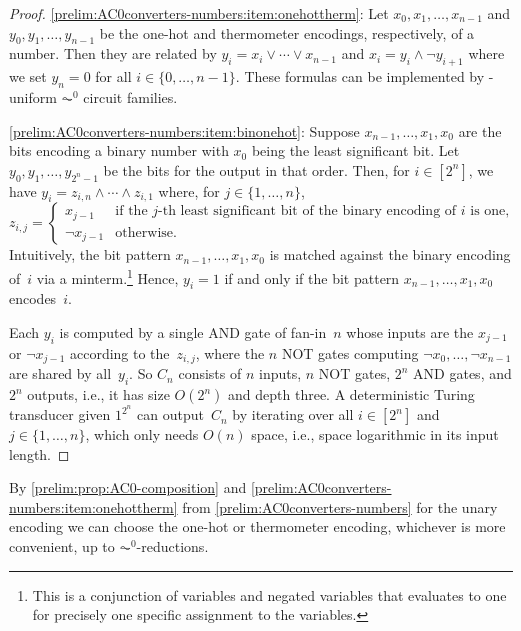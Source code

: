 \begin{proof}
\ref{prelim:AC0converters-numbers:item:onehottherm}: 
Let $x_0, x_1, \ldots, x_{n-1}$
and $y_0, y_1, \ldots, y_{n-1}$
be the one-hot and thermometer encodings, respectively, of a number.
Then they are related by 
$y_i  = x_i \lor \cdots \lor x_{n-1}$
and $x_i = y_i \land \neg y_{i+1}$ where we set $y_n = 0$
for all $i \in \{0,\ldots,n-1\}$.
These formulas can be implemented by \LOGSPACE-uniform $\AC^0$ circuit families.

\ref{prelim:AC0converters-numbers:item:binonehot}:
Suppose $x_{n-1}, \ldots, x_1, x_0$
are the bits encoding a binary number with $x_0$ being the least significant bit.
Let $y_0, y_1, \ldots, y_{2^n - 1}$
be the bits for the output in that order.
Then, for $i \in [2^n]$,
we have $y_i = z_{i,n} \land \cdots \land z_{i,1}$ where, for $j \in \{1,\ldots,n\}$,
\[
z_{i,j} = \begin{cases}
	x_{j-1}        & \text{if the $j$-th least significant bit of the binary encoding of $i$ is one,} \\
	\neg x_{j-1}   & \text{otherwise.}
\end{cases}
\]
Intuitively, the bit pattern $x_{n-1}, \ldots, x_1, x_0$ is matched against the binary encoding of~$i$
via a minterm.\footnote{This is a conjunction
	of variables and negated variables that evaluates to one for precisely one specific assignment to the variables.}
Hence, $y_i = 1$ if and only if the bit pattern $x_{n-1}, \ldots, x_1, x_0$ encodes~$i$.

Each $y_i$ is computed by a single {\sc AND} gate of fan-in~$n$
whose inputs are the $x_{j-1}$ or $\neg x_{j-1}$ according to the~$z_{i,j}$,
where the $n$ {\sc NOT} gates computing $\neg x_0, \ldots, \neg x_{n-1}$
are shared by all~$y_i$.
So $C_n$ consists of $n$ inputs, $n$ {\sc NOT} gates, $2^n$ {\sc AND} gates, and $2^n$ outputs,
i.e., it has size $O(2^n)$ and depth three.
A deterministic Turing transducer given $1^{2^n}$ can output~$C_n$
by iterating over all $i \in [2^n]$ and $j \in \{1,\ldots,n\}$,
which only needs $O(n)$ space, i.e., space logarithmic in its input length.
\end{proof}

By \cref{prelim:prop:AC0-composition} and \cref{prelim:AC0converters-numbers:item:onehottherm} from \cref{prelim:AC0converters-numbers} 
for the unary encoding we can choose the one-hot or thermometer encoding, whichever is more convenient,
up to $\AC^0$-reductions.

